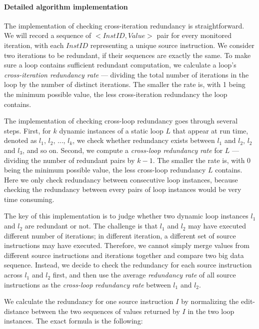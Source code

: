 \paragraph{Detailed algorithm implementation}

The implementation of checking cross-iteration redundancy is straightforward.
We will record a sequence of $<InstID, Value>$ pair for every monitored
iteration, with each $InstID$ representing a unique source instruction.
We consider two iterations to be redundant, if their sequences are exactly the
same. To make sure a loop contains sufficient redundant computation, 
we calculate a loop's \textit{cross-iteration redundancy rate} --- dividing 
the total number of iterations in the loop by the number of distinct iterations.
The smaller the rate is, with 1 being the minimum possible value, 
the less cross-iteration redundancy the loop contains.

The implementation of checking cross-loop redundancy goes through several
steps. First, for $k$ dynamic instances of a static loop $L$ that appear
at run time, denoted as $l_1$, $l_2$,
..., $l_k$, we check whether redundancy exists between $l_1$ and $l_2$, 
$l_2$ and $l_3$, and so on. Second, we compute a 
\textit{cross-loop redundancy rate} for $L$
--- dividing the number of redundant pairs by $k-1$.
The smaller the rate is, with 0 being the minimum possible value, the
less cross-loop redundancy $L$ contains.
Here we only check redundancy between consecutive loop instances, because  
checking the redundancy between every pairs of loop
instances would be very time consuming.

The key of this implementation is
to judge whether two dynamic loop instances $l_1$ and $l_2$ 
are redundant or not.
The challenge is that $l_1$ and $l_2$ may have executed different number of
iterations; in different iteration, a different set of source instructions
may have executed. Therefore, we cannot simply merge values from different
source instructions and iterations together and compare two big data sequence.
Instead, we decide to check the redundancy for each source instruction across
$l_1$ and $l_2$ first, and then use the average \textit{redundancy rate} of
all source instructions as the \textit{cross-loop redundancy rate} between
$l_1$ and $l_2$. 

We calculate the redundancy for one source instruction $I$ by normalizing the
edit-distance between the two sequences of values returned by $I$ in the two
loop instances. The exact formula is the following:

